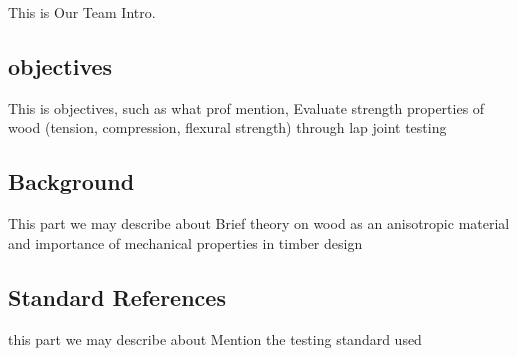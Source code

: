 This is Our Team Intro.
\subsection{objectives}
This is objectives, such as what prof mention, Evaluate strength properties of wood (tension, compression, flexural strength) through lap joint testing
\subsection{Background}
This part we may describe about Brief theory on wood as an anisotropic material and importance of mechanical properties in timber design
\subsection{Standard References}
this part we may describe about Mention the testing standard used